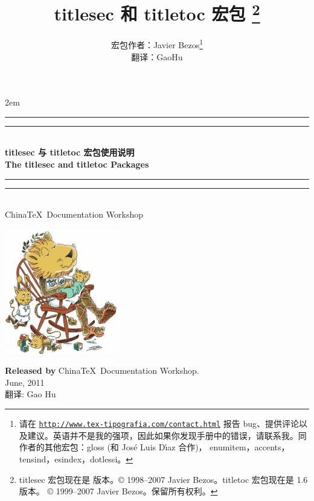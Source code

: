 \documentclass[a4paper,nofonts]{ltxguide}
\title{\textsf{titlesec} 和 \textsf{titletoc} 宏包
\footnote{\textsf{titlesec} 宏包现在是 \fileversion 版本。\copyright{} 1998--2007 Javier Bezos。\textsf{titletoc} 宏包现在是 1.6 版本。 \copyright{} 1999--2007 Javier Bezos。保留所有权利。}}
\author{宏包作者：Javier Bezos\footnote{请在 \href{http://www.tex-tipografia.com/contact.html}%
{\texttt{http://www.tex-tipografia.com/contact.html}} 报告 bug、提供评论以及建议。英语并不是我的强项，因此如果你发现手册中的错误，请联系我。同作者的其他宏包：\textsf{gloss} (和
Jos\'e Luis D\'{\i}az 合作)， \textsf{enumitem，accents，tensind，esindex，dotlessi}。}\\
翻译：GaoHu}
\date{\docdate}
\begin{document}
  
\fontsize{12}{20}\selectfont
\parindent 2em
\begin{titlepage}

\setlength{}
\vspace*{5\baselineskip}
\begin{center}
\rule{\unitlength}{1.6pt}\vspace*{-\baselineskip}\vspace*{2pt}
\rule{\unitlength}{0.4pt}\\[\baselineskip]
{\huge\bfseries{} titlesec 与 titletoc 宏包使用说明}\\[\baselineskip]
{\huge \bfseries The titlesec and titletoc Packages }\\[.7\baselineskip]
\rule{\unitlength}{0.4pt}\vspace*{-\baselineskip}\vspace{3.2pt}
\rule{\unitlength}{1.6pt}\\[\baselineskip]
{\large China\TeX\ Documentation Workshop}\par
\vspace*{3\baselineskip}
\includegraphics[width=5cm]{chinatex}
\end{center}
%
%
%
\vskip 3cm

\begin{flushright}
\begin{minipage}{.8\linewidth}
\flushright
\large
\textbf{Released by} China\TeX\ Documentation Workshop.\\
June, 2011\\
翻译: Gao Hu\\
\end{minipage}
\end{flushright}
\end{titlepage}
\newpage
\maketitle
\tableofcontents
\end{document}

